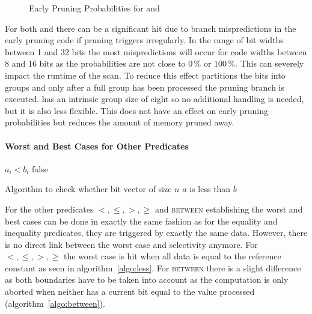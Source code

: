 \begin{figure}[h] \center
{}
\caption{Early Pruning Probabilities for \bwv{} and \bs{}}
\label{fig:earlypruningprobabilities}
\end{figure}

For both \bwv{} and \bs{} there can be a significant hit due to branch
mispredictions in the early pruning code if pruning triggers irregularly. In the
range of bit widths between 1 and 32 bits the most mispredictions will occur for
code widths between 8 and 16 bits as the probabilities are not close to $0\,\%$
or $100\,\%$. This can severely impact the runtime of the scan.  To
reduce this effect \bwv{} partitions the bits into groups and only after a full
group has been processed the pruning branch is executed. \bs{} has an intrinsic
group size of eight so no additional handling is needed, but it is also less
flexible. This does not have an effect on early pruning probabilities but
reduces the amount of memory pruned away.

\paragraph{Worst and Best Cases for Other Predicates}

\begin{algorithm}[h]
\begin{algorithmic}[1]
        \State \Return $a_i < b_i$
      \EndIf
    \EndFor
    \State \Return false
  \EndProcedure
\end{algorithmic}
\caption{Algorithm to check whether bit vector of size $n$ $a$ is less than $b$}
\label{algo:less}
\end{algorithm}

For the other predicates $<,\le,>,\ge$ and \textsc{between} establishing the
worst and best cases can be done in exactly the same fashion as for the
equality and inequality predicates, they are triggered by exactly the same data.
However, there is no direct link between the worst case and selectivity
anymore. For $<,\le,>,\ge$ the worst case is hit when all data is
equal to the reference constant as seen in algorithm~\ref{algo:less}. For
\textsc{between} there is a slight difference as both boundaries have to be
taken into account as the computation is only aborted when neither has a current
bit equal to the value processed (algorithm~\ref{algo:between}).

